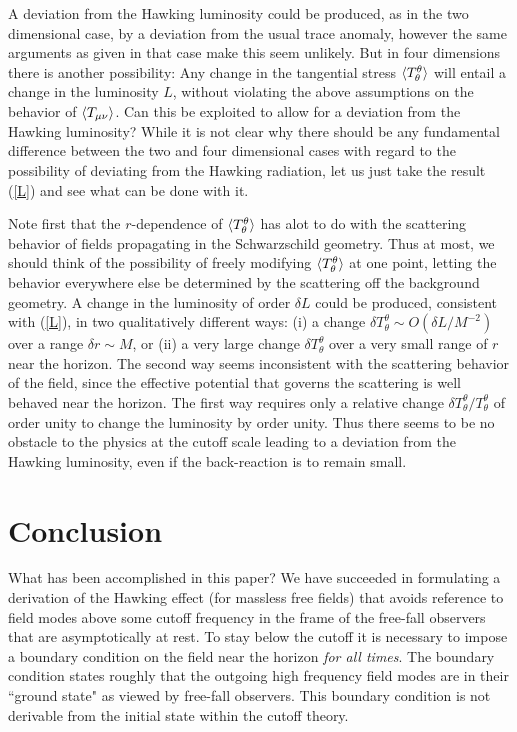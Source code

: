 A deviation from the Hawking luminosity could be produced,
as in the two dimensional case, by a deviation from the
usual trace anomaly, however the same arguments as given
in that case make this seem unlikely. But in four dimensions
there is another possibility: Any change in
the tangential stress $\langle T_\theta^\theta\rangle$ will entail
a change in the luminosity $L$, without violating the above
assumptions on the behavior of $\langle T_{\mu\nu}\rangle$.
Can this be exploited to allow for a deviation from the Hawking
luminosity? While it is not clear why there should be any fundamental
difference between the two and four dimensional cases with regard
to the possibility of deviating from the Hawking radiation, let us
just take the result (\ref{L}) and see what can be done with it.

Note first that the $r$-dependence of $\langle T_\theta^\theta\rangle$
has alot to do with the scattering behavior of fields propagating in
the Schwarzschild geometry. Thus at most, we should think of the
possibility of freely modifying $\langle T_\theta^\theta\rangle$ at one
point, letting the behavior everywhere else be determined by
the scattering off the background geometry.
A change in the luminosity of order $\delta L$
could be produced, consistent with (\ref{L}),
in two qualitatively different
ways: (i) a change $\delta T_\theta^\theta\sim
O(\delta L/M^{-2})$ over a range $\delta r\sim M$,
or (ii) a very large change $\delta T_\theta^\theta$
over a very small range of $r$ near the horizon.
The second way seems inconsistent with the scattering
behavior of the field, since the effective potential that governs
the scattering is well behaved near the horizon. The first way
requires only a relative change
$\delta T_\theta^\theta/T_\theta^\theta$
of order unity to change the luminosity by order unity.
Thus there seems to be no obstacle to the physics at the cutoff
scale leading to a deviation from the Hawking luminosity, even if
the back-reaction is to remain small.

\section{Conclusion}
\label{sec:7}

What has been accomplished in this paper? We have
succeeded in formulating a derivation of the Hawking
effect (for massless free fields) that avoids reference
to field modes above some
cutoff frequency in the frame of the free-fall
observers that are asymptotically at rest. To stay
below the cutoff it is necessary to impose a
boundary condition on the field  near the horizon {\it for all
times}. The boundary condition states roughly that the
outgoing high frequency field modes are in their ``ground
state" as viewed by free-fall observers.
This boundary condition is not derivable from
the initial state within the cutoff theory.

